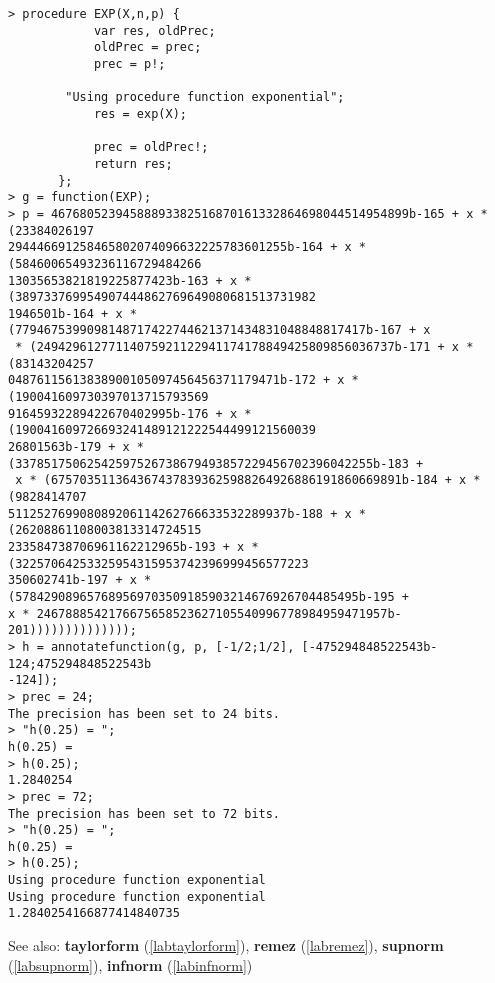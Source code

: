 \begin{center}\begin{minipage}{15cm}\begin{Verbatim}[frame=single]
> procedure EXP(X,n,p) {
            var res, oldPrec;
            oldPrec = prec;
            prec = p!;
            
        "Using procedure function exponential";
            res = exp(X);
            
            prec = oldPrec!;
            return res;
       };
> g = function(EXP);
> p = 46768052394588893382516870161332864698044514954899b-165 + x * (23384026197
294446691258465802074096632225783601255b-164 + x * (58460065493236116729484266
13035653821819225877423b-163 + x * (389733769954907444862769649080681513731982
1946501b-164 + x * (7794675399098148717422744621371434831048848817417b-167 + x
 * (24942961277114075921122941174178849425809856036737b-171 + x * (83143204257
04876115613838900105097456456371179471b-172 + x * (190041609730397013715793569
91645932289422670402995b-176 + x * (190041609726693241489121222544499121560039
26801563b-179 + x * (33785175062542597526738679493857229456702396042255b-183 +
 x * (6757035113643674378393625988264926886191860669891b-184 + x * (9828414707
511252769908089206114262766633532289937b-188 + x * (26208861108003813314724515
233584738706961162212965b-193 + x * (32257064253325954315953742396999456577223
350602741b-197 + x * (578429089657689569703509185903214676926704485495b-195 + 
x * 2467888542176675658523627105540996778984959471957b-201))))))))))))));
> h = annotatefunction(g, p, [-1/2;1/2], [-475294848522543b-124;475294848522543b
-124]);
> prec = 24;
The precision has been set to 24 bits.
> "h(0.25) = ";
h(0.25) = 
> h(0.25);
1.2840254
> prec = 72;
The precision has been set to 72 bits.
> "h(0.25) = ";
h(0.25) = 
> h(0.25);
Using procedure function exponential
Using procedure function exponential
1.2840254166877414840735
\end{Verbatim}
\end{minipage}\end{center}
See also: \textbf{taylorform} (\ref{labtaylorform}), \textbf{remez} (\ref{labremez}), \textbf{supnorm} (\ref{labsupnorm}), \textbf{infnorm} (\ref{labinfnorm})
